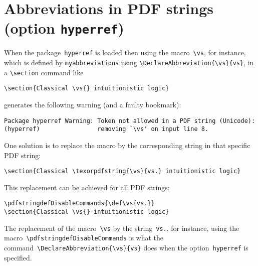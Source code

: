 \documentclass{article}
\begin{document}
\section{Abbreviations in PDF strings (option \texttt{hyperref})}

When the package~\texttt{hyperref} is loaded then using the
macro~\verb|\vs|, for instance, which is defined by
\texttt{myabbreviations} using \verb|\DeclareAbbreviation{\vs}{vs}|,
in a \verb|\section| command like
%
\begin{verbatim}
\section{Classical \vs{} intuitionistic logic}
\end{verbatim}
%
generates the following warning (and a faulty bookmark):
%
\begin{verbatim}
Package hyperref Warning: Token not allowed in a PDF string (Unicode):
(hyperref)                removing `\vs' on input line 8.
\end{verbatim}

One solution is to replace the macro by the corresponding string in
that specific PDF string:
%
\begin{verbatim}
\section{Classical \texorpdfstring{\vs}{vs.} intuitionistic logic}
\end{verbatim}
%
This replacement can be achieved for all PDF strings:
%
\begin{verbatim}
\pdfstringdefDisableCommands{\def\vs{vs.}}
\section{Classical \vs{} intuitionistic logic}
\end{verbatim}
%
The replacement of the macro~\verb|\vs| by the string~\texttt{vs.},
for instance, using the macro~\verb|\pdfstringdefDisableCommands| is
what the command~\verb|\DeclareAbbreviation{\vs}{vs}| does when the
option~\texttt{hyperref} is specified.
\end{document}
